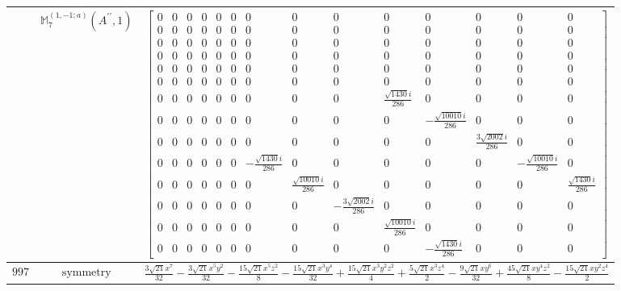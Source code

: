 \documentclass[fleqn,8pt,landscape]{jsarticle}
\begin{document}
\begin{longtable}{ccc}
$  $ & $ \mathbb{M}_{7}^{(1,-1;a)}(A^{\prime\prime},1) $ & $ \begin{bmatrix} 0 & 0 & 0 & 0 & 0 & 0 & 0 & 0 & 0 & 0 & 0 & 0 & 0 & 0 \\ 0 & 0 & 0 & 0 & 0 & 0 & 0 & 0 & 0 & 0 & 0 & 0 & 0 & 0 \\ 0 & 0 & 0 & 0 & 0 & 0 & 0 & 0 & 0 & 0 & 0 & 0 & 0 & 0 \\ 0 & 0 & 0 & 0 & 0 & 0 & 0 & 0 & 0 & 0 & 0 & 0 & 0 & 0 \\ 0 & 0 & 0 & 0 & 0 & 0 & 0 & 0 & 0 & 0 & 0 & 0 & 0 & 0 \\ 0 & 0 & 0 & 0 & 0 & 0 & 0 & 0 & 0 & 0 & 0 & 0 & 0 & 0 \\ 0 & 0 & 0 & 0 & 0 & 0 & 0 & 0 & 0 & \frac{\sqrt{1430} i}{286} & 0 & 0 & 0 & 0 \\ 0 & 0 & 0 & 0 & 0 & 0 & 0 & 0 & 0 & 0 & - \frac{\sqrt{10010} i}{286} & 0 & 0 & 0 \\ 0 & 0 & 0 & 0 & 0 & 0 & 0 & 0 & 0 & 0 & 0 & \frac{3 \sqrt{2002} i}{286} & 0 & 0 \\ 0 & 0 & 0 & 0 & 0 & 0 & - \frac{\sqrt{1430} i}{286} & 0 & 0 & 0 & 0 & 0 & - \frac{\sqrt{10010} i}{286} & 0 \\ 0 & 0 & 0 & 0 & 0 & 0 & 0 & \frac{\sqrt{10010} i}{286} & 0 & 0 & 0 & 0 & 0 & \frac{\sqrt{1430} i}{286} \\ 0 & 0 & 0 & 0 & 0 & 0 & 0 & 0 & - \frac{3 \sqrt{2002} i}{286} & 0 & 0 & 0 & 0 & 0 \\ 0 & 0 & 0 & 0 & 0 & 0 & 0 & 0 & 0 & \frac{\sqrt{10010} i}{286} & 0 & 0 & 0 & 0 \\ 0 & 0 & 0 & 0 & 0 & 0 & 0 & 0 & 0 & 0 & - \frac{\sqrt{1430} i}{286} & 0 & 0 & 0 \end{bmatrix} $ \\ \hline
$ 997 $ & $ \text{symmetry} $ & $ \frac{3 \sqrt{21} x^{7}}{32} - \frac{3 \sqrt{21} x^{5} y^{2}}{32} - \frac{15 \sqrt{21} x^{5} z^{2}}{8} - \frac{15 \sqrt{21} x^{3} y^{4}}{32} + \frac{15 \sqrt{21} x^{3} y^{2} z^{2}}{4} + \frac{5 \sqrt{21} x^{3} z^{4}}{2} - \frac{9 \sqrt{21} x y^{6}}{32} + \frac{45 \sqrt{21} x y^{4} z^{2}}{8} - \frac{15 \sqrt{21} x y^{2} z^{4}}{2} $ \\

\end{longtable}
\end{document}
